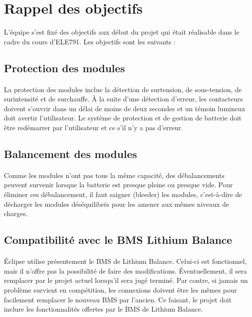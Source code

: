 \section{Rappel des objectifs}

	\paragraph{}
	L’équipe s’est fixé des objectifs aux début du projet qui était réalisable dans le cadre du cours d’ELE791. Les objectifs sont les suivants :

	\subsection{Protection des modules}
	
		\paragraph{}
		La protection des modules inclue la détection de surtension, de sous-tension, de surintensité et de surchauffe. À la suite d’une détection d’erreur, les contacteurs doivent s’ouvrir dans un délai de moins de deux secondes et un témoin lumineux doit avertir l’utilisateur. Le système de protection et de gestion de batterie doit être redémarrer par l’utilisateur et ce s’il n’y a pas d’erreur.

	\subsection{Balancement des modules}

		\paragraph{}
		Comme les modules n’ont pas tous la même capacité, des débalancements peuvent survenir lorsque la batterie est presque pleine ou presque vide. Pour éliminer ces débalancement, il faut saigner (bleeder) les modules, c’est-à-dire de décharger les modules déséquilibrés pour les amener aux mêmes niveaux de charges.
		
	\subsection{Compatibilité avec le BMS Lithium Balance}

		\paragraph{}
		Éclipse utilise présentement le BMS de Lithium Balance. Celui-ci est fonctionnel, mais il n’offre pas la possibilité de faire des modifications. Éventuellement, il sera remplacer par le projet actuel lorsqu'il sera jugé terminé. Par contre, si jamais un problème survient en compétition, les connexions doivent être les mêmes pour facilement remplacer le nouveau BMS par l’ancien. Ce faisant, le projet doit inclure les fonctionnalités offertes par le BMS de Lithium Balance.

